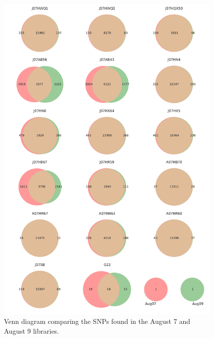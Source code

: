 \begin{figure}[!hbtp]
  \centering
  \includegraphics[width=\textwidth,height=0.9\textheight,keepaspectratio]{Chapter5/Figures/Venn_AugustSNPs.pdf}
  \caption{Venn diagram comparing the SNPs found in the August 7 and August 9 libraries.}
  \label{VennAug}
\end{figure}

